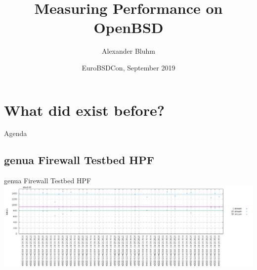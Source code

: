 \documentclass[14pt,aspectratio=169]{beamer}
\author{Alexander Bluhm}
\title{Measuring Performance on OpenBSD}
\institute{bluhm@openbsd.org}
\date{EuroBSDCon, September 2019}
\begin{document}
\begin{frame}
\titlepage
\end{frame}

\section{What did exist before?}

\begin{frame}{Agenda}
\setcounter{tocdepth}{1}
\tableofcontents[currentsection]
\end{frame}

\subsection{genua Firewall Testbed HPF}
\begin{frame}{genua Firewall Testbed HPF}
    \includegraphics[width=\textwidth]{images/gs700r7_obsd_proxy_tcp.png}
\end{frame}
\end{document}
